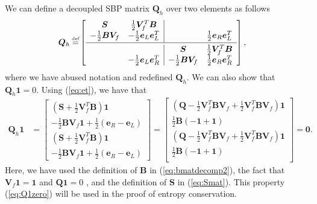 \documentclass[review,onefignum,onetabnum,final]{siamart171218}
\newcommand{\LRp}[1]{\left( #1 \right)}
\newcommand{\LRs}[1]{\left[ #1 \right]}
\newcommand\myeq{\mathrel{\stackrel{\makebox[0pt]{\mbox{\normalfont\tiny def}}}{=}}}
\begin{document}
We can define a decoupled SBP matrix $\bm{Q}_h$ over two elements as follows
\begin{align}
\bm{Q}_h \myeq& \LRs{\begin{array}{cc|cc}
\bm{S} &  \frac{1}{2}\bm{V}_f^T\bm{B} & & \\
 -\frac{1}{2}\bm{B}\bm{V}_f & -\frac{1}{2}\bm{e}_L\bm{e}_L^T & & \frac{1}{2}\bm{e}_R\bm{e}_L^T\\ [.2em]
 \hline\\[-1.0em]
&& \bm{S} & \frac{1}{2}\bm{V}_f^T\bm{B} \\
& -\frac{1}{2}\bm{e}_L\bm{e}_R^T & - \frac{1}{2}\bm{B}\bm{V}_f & \frac{1}{2}\bm{e}_R\bm{e}_R^T
\end{array}}, \label{eq:decoupledsbp2elem}
\end{align}
where we have abused notation and redefined $\bm{Q}_h$.  We can also show that $\bm{Q}_h\bm{1} = 0$.  Using (\ref{eq:et}), we have that
\begin{align}
\bm{Q}_h\bm{1} &= \begin{bmatrix}
\LRp{\bm{S} + \frac{1}{2}\bm{V}_f^T\bm{B} }\bm{1}\\
-\frac{1}{2}\bm{B}\bm{V}_f\bm{1} + \frac{1}{2}\LRp{\bm{e}_R-\bm{e}_L}\\
\LRp{\bm{S} + \frac{1}{2}\bm{V}_f^T\bm{B} }\bm{1}\\
-\frac{1}{2}\bm{B}\bm{V}_f\bm{1} + \frac{1}{2}\LRp{\bm{e}_R-\bm{e}_L}
\end{bmatrix} 
= 
\begin{bmatrix}
\LRp{\bm{Q} - \frac{1}{2}\bm{V}_f^T\bm{B}\bm{V}_f + \frac{1}{2}\bm{V}_f^T\bm{B}\bm{V}_f}\bm{1}\\
\frac{1}{2}\bm{B}\LRp{-\bm{1} + \bm{1}}\\
\LRp{\bm{Q} - \frac{1}{2}\bm{V}_f^T\bm{B}\bm{V}_f + \frac{1}{2}\bm{V}_f^T\bm{B}\bm{V}_f}\bm{1}\\
\frac{1}{2}\bm{B}\LRp{-\bm{1} + \bm{1}}\\
\end{bmatrix} = \bm{0}.
\label{eq:Q1zero}
\end{align}
Here, we have used the definition of $\bm{B}$ in (\ref{eq:bmatdecomp2}), the fact that $\bm{V}_f\bm{1} = \bm{1}$ and $\bm{Q}\bm{1} = 0$ \cite{fernandez2014generalized}, and the definition of $\bm{S}$ in (\ref{eq:Smat}).  This property (\ref{eq:Q1zero}) will be used in the proof of entropy conservation.  
\end{document}

